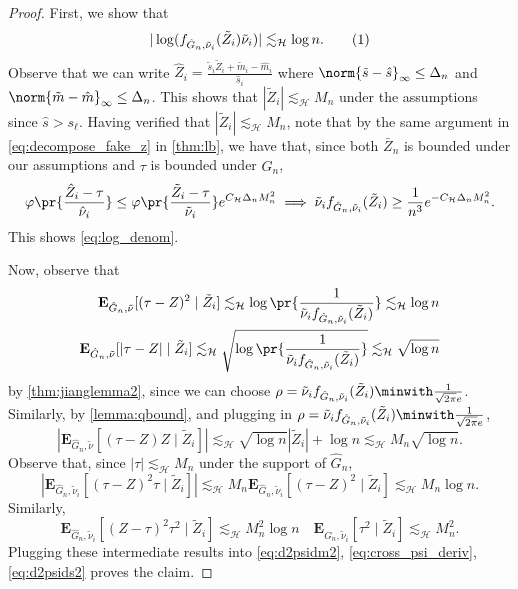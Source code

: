 \documentclass[12pt, reqno]{amsart}
\newcommand\numberthis{\addtocounter{equation}{1}\tag{\theequation}}
\newcommand{\absauto}[1]{\left| #1 \right|}
\newcommand{\Hyperparams}{\mathcal{H}}
\newcommand{\leH}{\lesssim_{\mathcal{H}}}
\newcommand{\hatm}{\hat m}
\newcommand{\hats}{\hat s}
\newcommand{\PE}{\mathbf{E}}
\numberwithin{equation}{section}
\begin{document}
\begin{refsection}
\begin{appendices}
\begin{proof}
    First, we show that \[
    |\log(f_{\hat G_n, \tilde \nu_i}(\tilde Z_i) \tilde\nu_i)| \leH \log n.
    \numberthis \label{eq:log_denom}
    \]
    Observe that we can write $
    \hat Z_i = \frac{\tilde s_i \tilde Z_i + \tilde m_i - \hatm_i}{\hats_i}
    $
    where $\norm{\tilde s- \hats}_\infty \le \Delta_n$ and $\norm{\tilde m
    - \hatm}_\infty \le \Delta_n$. This shows that $|\tilde Z_i| \leH M_n$ under the
      assumptions since $\hat s > s_\ell$. Having verified that $|\tilde Z_i| \leH M_n$,
      note that by the same argument in
    \eqref{eq:decompose_fake_z} in \cref{thm:lb},
    we have
    that, since both $\bar Z_n$ is bounded under our assumptions and $\tau$ is bounded
    under $\hat G_n$,
    \[
    \varphi\pr{\frac{\hat Z_i - \tau}{\hat \nu_i}} \le \varphi
    \pr{\frac{\tilde Z_i - \tau}{\tilde \nu_i}} e^{C_\Hyperparams
    \Delta_n M_n^2}
    \implies
    \tilde \nu_i f_{\hat G_n, \tilde \nu_i}(\tilde Z_i) \ge \frac{1}{n^3}e^
    {-C_{\Hyperparams} \Delta_n M_n^2}.
    \]
    This shows \eqref{eq:log_denom}.


    Now, observe that \begin{align*}
    \PE_{\hat G_n, \tilde \nu}[(\tau - Z)^2 \mid \tilde Z_i] \leH \log
    \pr{\frac{1}{\tilde \nu_i f_{\hat G_n, \tilde \nu_i}(\tilde Z_i)}} \leH \log n \\
    \PE_{\hat G_n, \tilde \nu}[|\tau - Z| \mid \tilde Z_i] \leH \sqrt{\log
    \pr{\frac{1}{\tilde \nu_i f_{\hat G_n, \tilde \nu_i}(\tilde Z_i)}}}
    \leH \sqrt{\log n}
    \end{align*}
    by \cref{thm:jianglemma2}, since we can choose $\rho = \tilde
    \nu_i f_{\hat G_n, \tilde \nu_i}(\tilde Z_i) \minwith \frac{1}{\sqrt{2\pi} e}$.
    Similarly, by
    \cref{lemma:qbound}, and plugging in $\rho = \tilde
    \nu_i f_{\hat G_n, \tilde \nu_i}(\tilde Z_i) \minwith \frac{1}{\sqrt{2\pi} e}$, \[
    \absauto{\PE_{\hat G_n, \tilde \nu}[(\tau - Z)Z \mid \tilde Z_i]} \leH
    \sqrt{\log n} |\tilde Z_i| + \log n \leH M_n \sqrt{\log n} .
    \]
    Observe that, since $|\tau| \leH M_n$ under the support of $\hat G_n$, \[
    \absauto{\PE_{\hat G_n, \tilde \nu_i}[(\tau-Z)^2 \tau \mid \tilde Z_i]} \leH M_n
    \PE_{\hat G_n, \tilde \nu_i}[(\tau-Z)^2 \mid \tilde Z_i] \leH M_n \log n.
    \]
    Similarly, \[
    \PE_{\hat G_n, \tilde \nu_i}[(Z-\tau)^2 \tau^2 \mid \tilde Z_i] \leH
    M_n^2 \log n \quad
    \PE_{\hat G_n, \tilde \nu_i}[\tau^2 \mid \tilde Z_i] \leH M_n^2.
    \]
    Plugging these intermediate results into \eqref{eq:d2psidm2}, \eqref{eq:cross_psi_deriv},
    \eqref{eq:d2psids2} proves the claim.
\end{proof}




\end{appendices}
\end{refsection}
\end{document}
